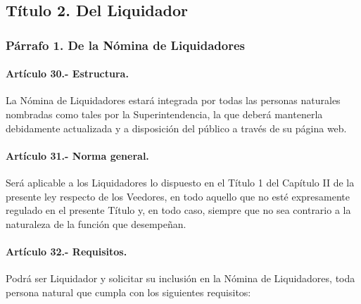 \documentclass[
]{book}
\begin{document}
\hypertarget{tuxedtulo-2.-del-liquidador}{%
\subsection*{Título 2. Del Liquidador}\label{tuxedtulo-2.-del-liquidador}}

\hypertarget{puxe1rrafo-1.-de-la-nuxf3mina-de-liquidadores}{%
\subsubsection*{Párrafo 1. De la Nómina de Liquidadores}\label{puxe1rrafo-1.-de-la-nuxf3mina-de-liquidadores}}

\hypertarget{artuxedculo-30.--estructura.}{%
\paragraph*{Artículo 30.- Estructura.}\label{artuxedculo-30.--estructura.}}

La Nómina de Liquidadores estará integrada por todas las personas naturales nombradas como tales por la Superintendencia, la que deberá mantenerla debidamente actualizada y a disposición del público a través de su página web.

\hypertarget{artuxedculo-31.--norma-general.}{%
\paragraph*{Artículo 31.- Norma general.}\label{artuxedculo-31.--norma-general.}}

Será aplicable a los Liquidadores lo dispuesto en el Título 1 del Capítulo II de la presente ley respecto de los Veedores, en todo aquello que no esté expresamente regulado en el presente Título y, en todo caso, siempre que no sea contrario a la naturaleza de la función que desempeñan.

\hypertarget{artuxedculo-32.--requisitos.}{%
\paragraph*{Artículo 32.- Requisitos.}\label{artuxedculo-32.--requisitos.}}

Podrá ser Liquidador y solicitar su inclusión en la Nómina de Liquidadores, toda persona natural que cumpla con los siguientes requisitos:
\end{document}
